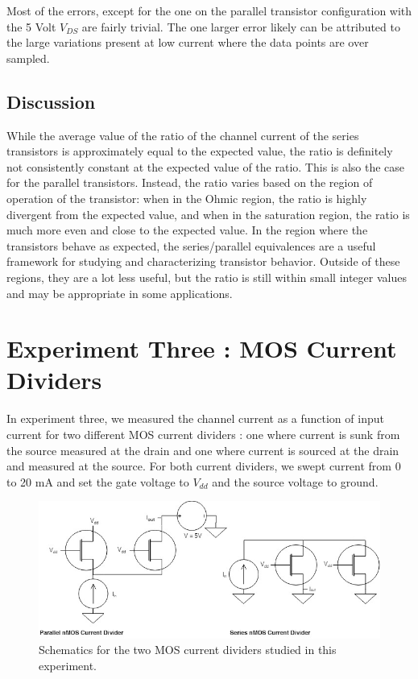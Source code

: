 \documentclass{article}
\begin{document}
Most of the errors, except for the one on the parallel transistor configuration with the 5 Volt $V_{DS}$ are fairly trivial. The one larger error likely can be attributed to the large variations present at low current where the data points are over sampled.
\subsection{Discussion}
While the average value of the ratio of the channel current of the series transistors is approximately equal to the expected value, the ratio is definitely not consistently constant at the expected value of the ratio. This is also the case for the parallel transistors. Instead, the ratio varies based on the region of operation of the transistor: when in the Ohmic region, the ratio is highly divergent from the expected value, and when in the saturation region, the ratio is much more even and close to the expected value. In the region where the transistors behave as expected, the series/parallel equivalences are a useful framework for studying and characterizing transistor behavior. Outside of these regions, they are a lot less useful, but the ratio is still within small integer values and may be appropriate in some applications. 


\section{Experiment Three : MOS Current Dividers}
In experiment three, we measured the channel current as a function of input current for two different MOS current dividers : one where current is sunk from the source measured at the drain and one where current is sourced at the drain and measured at the source.  For both current dividers, we swept current from 0 to 20 mA and set the gate voltage to $V_{dd}$ and the source voltage to ground.
\begin{figure}[H]   
  \begin{center}       
  \includegraphics[scale = 0.5]{images/exp3_schematic.jpg}
  \caption{Schematics for the two MOS current dividers studied in this experiment.}
  \label{fig:exp2_sch}
  \end{center}
\end{figure}
\end{document}
